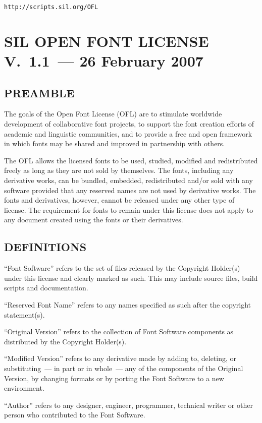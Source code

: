 \documentclass[12pt,a4paper,openany]{article}
\begin{document}
\texttt{http://scripts.sil.org/OFL}

\section*{SIL OPEN FONT LICENSE V.~1.1~--- 26 February 2007}

\subsection*{PREAMBLE}

The goals of the Open Font License (OFL) are to stimulate worldwide
development of collaborative font projects, to support the font creation
efforts of academic and linguistic communities, and to provide a free and
open framework in which fonts may be shared and improved in partnership
with others.

The OFL allows the licensed fonts to be used, studied, modified and
redistributed freely as long as they are not sold by themselves. The
fonts, including any derivative works, can be bundled, embedded,
redistributed and/or sold with any software provided that any reserved
names are not used by derivative works. The fonts and derivatives,
however, cannot be released under any other type of license. The
requirement for fonts to remain under this license does not apply
to any document created using the fonts or their derivatives.

\subsection*{DEFINITIONS}

“Font Software” refers to the set of files released by the Copyright
Holder(s) under this license and clearly marked as such. This may
include source files, build scripts and documentation.

“Reserved Font Name” refers to any names specified as such after the
copyright statement(s).

“Original Version” refers to the collection of Font Software components as
distributed by the Copyright Holder(s).

“Modified Version” refers to any derivative made by adding to, deleting,
or substituting~--- in part or in whole~--- any of the components of the
Original Version, by changing formats or by porting the Font Software to a
new environment.

“Author” refers to any designer, engineer, programmer, technical
writer or other person who contributed to the Font Software.
\end{document}
